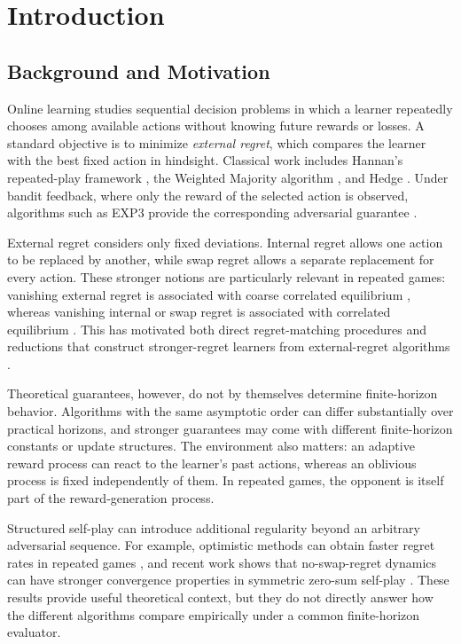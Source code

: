\chapter{Introduction}
\label{chap:introduction}

\section{Background and Motivation}

Online learning studies sequential decision problems in which a learner
repeatedly chooses among available actions without knowing future rewards or
losses. A standard objective is to minimize \emph{external regret}, which
compares the learner with the best fixed action in hindsight. Classical work
includes Hannan's repeated-play framework \citep{dresher_approximation_1958},
the Weighted Majority algorithm \citep{littlestone_weighted_1994}, and Hedge
\citep{freund_decision-theoretic_1997}. Under bandit feedback, where only the
reward of the selected action is observed, algorithms such as EXP3 provide the
corresponding adversarial guarantee \citep{auer_nonstochastic_2002}.

External regret considers only fixed deviations. Internal regret allows one
action to be replaced by another, while swap regret allows a separate
replacement for every action. These stronger notions are particularly relevant
in repeated games: vanishing external regret is associated with coarse
correlated equilibrium \citep{chen_hedging_2020}, whereas vanishing internal
or swap regret is associated with correlated equilibrium
\citep{hart_simple_2000,blum_external_2007}. This has motivated both direct
regret-matching procedures and reductions that construct stronger-regret
learners from external-regret algorithms
\citep{hart_simple_2000,blum_external_2007,ito_tight_2020}.

Theoretical guarantees, however, do not by themselves determine finite-horizon
behavior. Algorithms with the same asymptotic order can differ substantially
over practical horizons, and stronger guarantees may come with different
finite-horizon constants or update structures. The environment also matters:
an adaptive reward process can react to the learner's past actions, whereas an
oblivious process is fixed independently of them. In repeated games, the
opponent is itself part of the reward-generation process.

Structured self-play can introduce additional regularity beyond an arbitrary
adversarial sequence. For example, optimistic methods can obtain faster regret
rates in repeated games \citep{chen_hedging_2020}, and recent work shows that
no-swap-regret dynamics can have stronger convergence properties in symmetric
zero-sum self-play \citep{leme_convergence_2024}. These results provide useful
theoretical context, but they do not directly answer how the different
algorithms compare empirically under a common finite-horizon evaluator.

